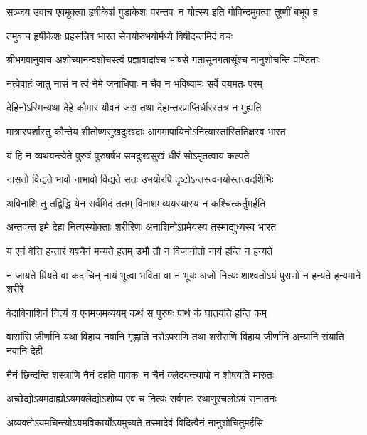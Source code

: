 {सञ्जय उवाच}
\twolineshloka
{एवमुक्त्वा हृषीकेशं गुडाकेशः परन्तपः}
{न योत्स्य इति गोविन्दमुक्त्वा तूष्णीं बभूव ह}%

\twolineshloka
{तमुवाच हृषीकेशः प्रहसन्निव भारत}
{सेनयोरुभयोर्मध्ये विषीदन्तमिदं वचः}%

{श्रीभगवानुवाच}
\twolineshloka
{अशोच्यानन्वशोचस्त्वं प्रज्ञावादांश्च भाषसे}
{गतासूनगतासूंश्च नानुशोचन्ति पण्डिताः}%

\twolineshloka
{नत्वेवाहं जातु नासं न त्वं नेमे जनाधिपाः}
{न चैव न भविष्यामः सर्वे वयमतः परम्}%

\twolineshloka
{देहिनोऽस्मिन्यथा देहे कौमारं यौवनं जरा}
{तथा देहान्तरप्राप्तिर्धीरस्तत्र न मुह्यति}%

\twolineshloka
{मात्रास्पर्शास्तु कौन्तेय शीतोष्णसुखदुःखदाः}
{आगमापायिनोऽनित्यास्तांस्तितिक्षस्व भारत}%

\twolineshloka
{यं हि न व्यथयन्त्येते पुरुषं पुरुषर्षभ}
{समदुःखसुखं धीरं सोऽमृतत्वाय कल्पते}%

\twolineshloka
{नासतो विद्यते भावो नाभावो विद्यते सतः}
{उभयोरपि दृष्टोऽन्तस्त्वनयोस्तत्त्वदर्शिभिः}%

\twolineshloka
{अविनाशि तु तद्विद्धि येन सर्वमिदं ततम्}
{विनाशमव्ययस्यास्य न कश्चित्कर्तुमर्हति}%

\twolineshloka
{अन्तवन्त इमे देहा नित्यस्योक्ताः शरीरिणः}
{अनाशिनोऽप्रमेयस्य तस्माद्युध्यस्व भारत}%

\twolineshloka
{य एनं वेत्ति हन्तारं यश्चैनं मन्यते हतम्}
{उभौ तौ न विजानीतो नायं हन्ति न हन्यते}%

\fourlineindentedshloka
{न जायते म्रियते वा कदाचिन्}
{नायं भूत्वा भविता वा न भूयः}
{अजो नित्यः शाश्वतोऽयं पुराणो}
{न हन्यते हन्यमाने शरीरे}%

\twolineshloka
{वेदाविनाशिनं नित्यं य एनमजमव्ययम्}
{कथं स पुरुषः पार्थ कं घातयति हन्ति कम्}%

\fourlineindentedshloka
{वासांसि जीर्णानि यथा विहाय}
{नवानि गृह्णाति नरोऽपराणि}
{तथा शरीराणि विहाय जीर्णानि}
{अन्यानि संयाति नवानि देही}%

\twolineshloka
{नैनं छिन्दन्ति शस्त्राणि नैनं दहति पावकः}
{न चैनं क्लेदयन्त्यापो न शोषयति मारुतः}%

\twolineshloka
{अच्छेद्योऽयमदाह्योऽयमक्लेद्योऽशोष्य एव च}
{नित्यः सर्वगतः स्थाणुरचलोऽयं सनातनः}%

\twolineshloka
{अव्यक्तोऽयमचिन्त्योऽयमविकार्योऽयमुच्यते}
{तस्मादेवं विदित्वैनं नानुशोचितुमर्हसि}%

